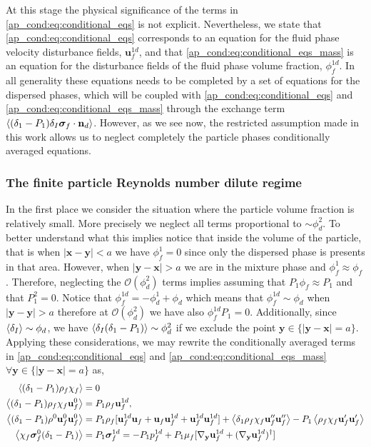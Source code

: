 At this stage the physical significance of the terms in \ref{ap_cond:eq:conditional_eqs} is not explicit. 
Nevertheless, we state that \ref{ap_cond:eq:conditional_eqs} corresponds to an equation for the fluid phase velocity disturbance fields, $\textbf{u}_f^{1d}$, and that \ref{ap_cond:eq:conditional_eqs_mass} is an equation for the disturbance fields of the fluid phase volume fraction, $\phi_f^{1d}$. 
In all generality these equations needs to be completed by a set of equations for the dispersed phases, which will be coupled with \ref{ap_cond:eq:conditional_eqs} and \ref{ap_cond:eq:conditional_eqs_mass} through the exchange term $\left<(\delta_1 - P_1)\delta_I \bm\sigma_f \cdot \textbf{n}_d\right>$. 
However, as we see now, the restricted assumption made in this work allows us to neglect completely the particle phases conditionally averaged equations. 



\subsubsection{The finite particle Reynolds number dilute regime}
In the first place we consider the situation where the particle volume fraction is relatively small. 
More precisely we neglect all terms proportional to $\sim \phi_d^2$. 
To better understand what this implies notice that inside the volume of the particle, that is when $|\textbf{x}-\textbf{y}| < a$ we have $\phi_f^1 = 0$ since only the dispersed phase is presents in that area. 
However, when $|\textbf{y} - \textbf{x}| >a$ we are in the mixture phase and $\phi_f^1 \approx \phi_f$.
Therefore, neglecting the $\mathcal{O}(\phi_d^2)$ terms  implies assuming that $P_1 \phi_f \approx P_1$ and that $P_1^2 = 0$. 
Notice that $\phi_f^{1d} = -\phi_d^1 + \phi_d$ which means that $\phi_f^{1d} \sim \phi_d$ when $|\textbf{y} -\textbf{y}| > a$ therefore at  $\mathcal{O}(\phi_d^2)$ we have also $\phi_f^{1d} P_1= 0$. 
Additionally, since $\left<\delta_I\right>\sim \phi_d$, we have $\left<\delta_I(\delta_1-P_1)\right>\sim \phi_d^2$ if we exclude the point $\textbf{y}\in \{|\textbf{y}-\textbf{x}| = a\}$. 
Applying these considerations, we may rewrite the conditionally averaged terms in \ref{ap_cond:eq:conditional_eqs} and \ref{ap_cond:eq:conditional_eqs_mass}  $\forall \textbf{y}\in \{|\textbf{y}-\textbf{x}| = a\}$ as, 
\begin{align*}
    \left<(\delta_1 - P_1)\rho_f\chi_f\right>
    &=0 \\ 
    \left<(\delta_1 - P_1)\rho_f\chi_f\textbf{u}^0_f\right>
    &= P_1 \rho_f \textbf{u}_f^{1d},\\
    \left<(\delta_1 - P_1)\rho^0\textbf{u}^0_f\textbf{u}^0_f\right>
    &=
    P_1\rho_f[
        \textbf{u}^{1d}_f\textbf{u}_f
        + \textbf{u}_f\textbf{u}_f^{1d}
        + \textbf{u}^{1d}_f\textbf{u}_f^{1d}
    ]
    + \left<\delta_1\rho_f\chi_f\textbf{u}_f''\textbf{u}_f''\right>
    - P_1 \left<\rho_f\chi_f\textbf{u}_f'\textbf{u}_f'\right>\\
    \left<\chi_f \bm\sigma^0_f(\delta_1 - P_1)\right> 
    &= 
    P_1 \bm\sigma^{1d}_f 
    = 
    -P_1  p_f^{1d} 
    +P_1 \mu_f [{\mathbf{\nabla}_\textbf{y}} \textbf{u}_f^{1d}+({\mathbf{\nabla}_\textbf{y}} \textbf{u}_f^{1d})^\dagger ]
\end{align*}

